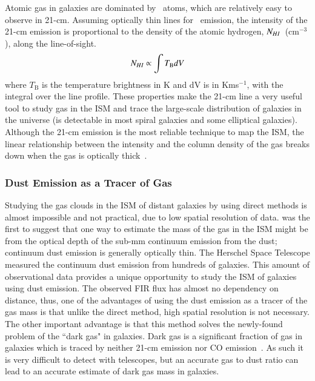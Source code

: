  
Atomic gas in galaxies are dominated by \hi~atoms, which are relatively easy to observe in 21-cm.
Assuming optically thin lines for \hi~emission, the intensity of the 21-cm emission is proportional to the density of the atomic hydrogen, $N_{H {\sc I}}$~(cm$^{-3}$), along the line-of-sight.
\begin{equation}
N_{H {\sc I}}  \propto \int T_{\mathrm B} dV
\end{equation}
where $T_{\mathrm B}$ is the temperature brightness in K and dV is in Kms$^{-1}$, with the integral over the line profile. 
These properties make the 21-cm line a very useful tool to study gas in the ISM and trace the large-scale distribution of galaxies in the universe (\hi is detectable in most spiral galaxies and some elliptical galaxies).
Although the 21-cm emission is the most reliable technique to map the ISM, the linear relationship between the intensity and the column density of the gas breaks down when the gas is optically thick~\citep{Braun09}. 

\subsubsection{Dust Emission as a Tracer of Gas} 

Studying the gas clouds in the ISM of distant galaxies by using direct methods is almost impossible and not practical, due to low spatial resolution of data.
\cite{Hildebran83} was the first to suggest that one way to estimate the mass of the gas in the ISM might be from the optical depth of the sub-mm continuum emission from the dust; continuum dust emission is generally optically thin. 
The Herschel Space Telescope \cite{Pilbratt10} measured the continuum dust emission from hundreds of galaxies\citep{Eales10, Oliver12}. 
This amount of observational data provides a unique opportunity to study the ISM of galaxies using dust emission. 
The observed FIR flux has almost no dependency on distance, thus, one of the advantages of using the dust emission as a tracer of the gas mass is that unlike the direct method, high spatial resolution is not necessary. 
The other important advantage is that this method solves the newly-found problem of the ``dark gas" in galaxies. 
Dark gas is a significant fraction of gas in galaxies which is traced by neither 21-cm emission nor CO emission~\citep{Abdo10}. 
As such it is very difficult to detect with telescopes, but an accurate gas to dust ratio can lead to an accurate estimate of dark gas mass in galaxies. 

